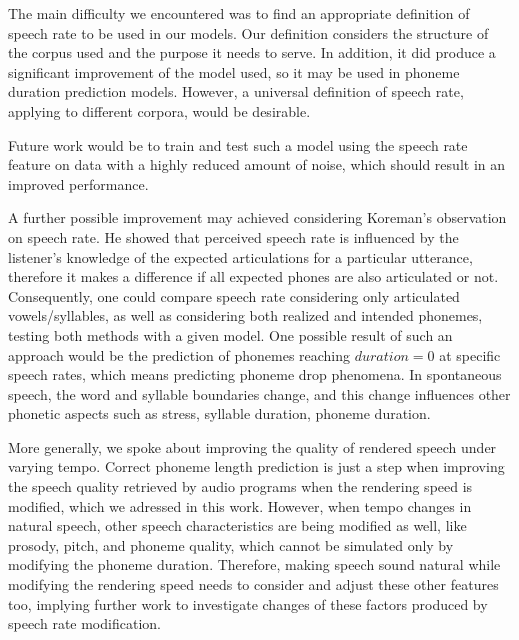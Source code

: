 \documentclass[11pt,a4paper]{scrbook}
\begin{document}
The main difficulty we encountered was to find an appropriate definition of speech rate to be used in our models. Our definition considers the structure of the corpus used and the purpose it needs to serve. In addition, it did produce a significant improvement of the model used, so it may be used in phoneme duration prediction models. However, a universal definition of speech rate, applying to different corpora, would be desirable.

Future work would be to train and test such a model using the speech rate feature on data with a highly reduced amount of noise, which should result in an improved performance. 

A further possible improvement may achieved considering Koreman's observation \cite{Koreman_2006} on speech rate. He showed that perceived speech rate is influenced by the listener's knowledge of the expected articulations for a particular utterance, therefore it makes a difference if all expected phones are also articulated or not. Consequently, one could compare speech rate considering only articulated vowels/syllables, as well as considering both realized and intended phonemes, testing both methods with a given model. One possible result of such an approach would be the prediction of phonemes reaching $duration = 0$ at specific speech rates, which means predicting phoneme drop phenomena. In spontaneous speech, the word and syllable boundaries change, and this change influences other phonetic aspects such as stress, syllable duration, phoneme duration.

More generally, we spoke about improving the quality of rendered speech under varying tempo. Correct phoneme length prediction is just a step when improving the speech quality retrieved by audio programs when the rendering speed is modified, which we adressed in this work. However, when tempo changes in natural speech, other speech characteristics are being modified as well, like prosody, pitch, and phoneme quality, which cannot be simulated only by modifying the phoneme duration. Therefore, making speech sound natural while modifying the rendering speed needs to consider and adjust these other features too, implying further work to investigate changes of these factors produced by speech rate modification.



\printbibliography
\backmatter 

\thispagestyle{empty}
\end{document}
